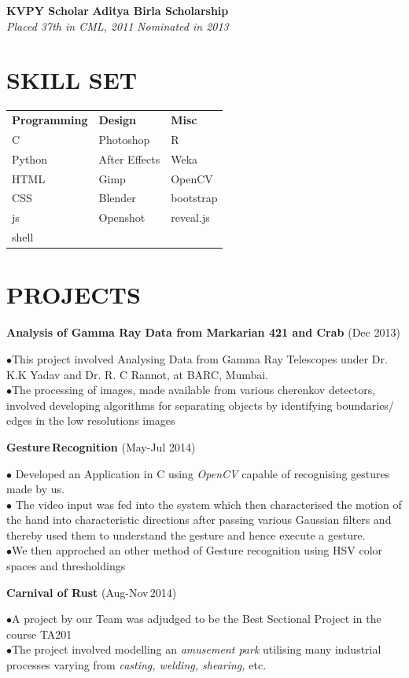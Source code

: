 \documentclass{article}
\newcommand{\sepspace}{\vspace*{0.8em}}
\newcommand{\NewPart}[1]{\section*{\uppercase{#1}}}
\newcommand{\SkillsEntry}[3]{#1 & #2 & #3\\}
\newcommand{\ScholasticAcheivements}[4]{
		\noindent \textbf{#1} \hfill \textbf{#2} \\
		\textit{#3}	 \hfill	 \textit{ #4} 	
		\normalsize \par
		}
\newcommand{\WorkEntry}[3]{						
		\noindent \textbf{#1} \hfill 					
		(#2) \par		
		\noindent #3 \par					
		}
\begin{document}
\ScholasticAcheivements{KVPY Scholar}{Aditya Birla Scholarship}{Placed 37th in CML, 2011}{Nominated in 2013}
\NewPart{Skill Set}
	\begin{tabular}{m{}  m{} m{}}
		\SkillsEntry{\textbf{Programming}}{\textbf{Design}}{\textbf{Misc}}
		\SkillsEntry{C}{Photoshop}{R}
		\SkillsEntry{Python}{After Effects}{Weka}
		\SkillsEntry{HTML}{Gimp}{OpenCV}
		\SkillsEntry{CSS}{Blender}{bootstrap}
		\SkillsEntry{js}{Openshot}{reveal.js}
		\SkillsEntry{shell}{}{}
	\end{tabular}
\NewPart{Projects}
\WorkEntry{Analysis of Gamma Ray Data from Markarian 421 and Crab}{Dec 2013}{$\bullet$This project involved Analysing Data from Gamma Ray Telescopes under Dr. K.K Yadav and Dr. R. C Rannot, at BARC, Mumbai.\\$\bullet$The processing of images, made available from various cherenkov detectors, involved developing algorithms for separating objects by identifying boundaries/ edges in the low resolutions images}
\pagebreak
\WorkEntry{Gesture\,Recognition}{May-Jul 2014}{$\bullet$ Developed an Application in C using \emph{OpenCV} capable of recognising gestures made by us.\\ $\bullet$ The video input was fed into the system which then characterised the motion of the hand into characteristic
directions after passing various Gaussian filters and thereby used them to understand the gesture and
hence execute a gesture.\\$\bullet$We then approched an other method of Gesture recognition using HSV color spaces and thresholdings}
\sepspace
\WorkEntry{Carnival of Rust}{Aug-Nov\,2014}{$\bullet$A project by our Team was adjudged to be the Best Sectional Project in the course TA201\\$\bullet$The project involved modelling an \emph{amusement park} utilising many industrial processes varying from \emph{casting, welding, shearing,} etc.}
\sepspace
\end{document}
